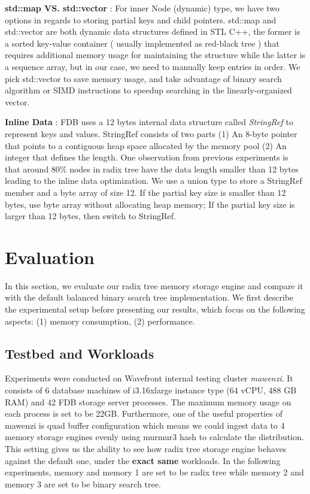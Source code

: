 \documentclass[sigplan,screen,nonacm]{acmart}
\begin{document}
\textbf {std::map VS. std::vector} : For inner Node (dynamic) type, we have two options in regards to storing partial keys and child pointers. std::map and std::vector are both dynamic data structures defined in STL C++, the former is a sorted key-value container ( usually implemented as red-black tree ) that requires additional memory usage for maintaining the structure while the latter is a sequence array, but in our case, we need to manually keep entries in order. We pick std::vector to save memory usage, and take advantage of binary search algorithm or SIMD instructions to speedup searching in the linearly-organized vector. 

\textbf {Inline Data} :  FDB uses a 12 bytes internal data structure called {\itshape StringRef} to represent keys and values. StringRef consists of two parts (1) An 8-byte pointer that points to a contiguous heap space allocated by the memory pool (2) An integer that defines the length. One observation from previous experiments is that around 80\% nodes in radix tree have the data length smaller than 12 bytes leading to the inline data optimization. We use a union type to store a StringRef member and a byte array of size 12. If the partial key size is smaller than 12 bytes, use byte array without allocating heap memory; If the partial key size is larger than 12 bytes, then switch to StringRef. 

\section{Evaluation}
In this section, we evaluate our radix tree memory storage engine and compare it with the default balanced binary search tree implementation. We first describe the experimental setup before presenting our results, which focus on the following aspects: (1) memory consumption, (2) performance. 
 
\subsection{Testbed and Workloads}
Experiments were conducted on Wavefront internal testing cluster {\itshape mawenzi}. It consists of 6 database machines of i3.16xlarge instance type (64 vCPU, 488 GB RAM) and 42 FDB storage server processes. The maximum memory usage on each process is set to be 22GB. Furthermore, one of the useful properties of mawenzi is quad buffer configuration which means we could ingest data to 4 memory storage engines evenly using murmur3 hash to calculate the distribution. This setting gives us the ability to see how radix tree storage engine behaves against the default one, under the \textbf {exact same} workloads. In the following experiments, memory and memory 1 are set to be radix tree while memory 2 and memory 3 are set to be binary search tree. 
\end{document}
